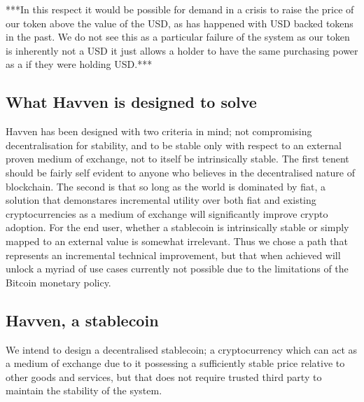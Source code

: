 ***In this respect it would be possible for demand in a crisis to raise the price of our token above the value of the USD, as has happened with USD backed tokens in the past. We do not see this as a particular failure of the system as our token is inherently not a USD it just allows a holder to have the same purchasing power as a if they were holding USD.***

\subsection{What Havven is designed to solve}

\noindent Havven has been designed with two criteria in mind; not compromising decentralisation for stability, and to be stable only with respect to an external proven medium of exchange, not to itself be intrinsically stable. The first tenent should be fairly self evident to anyone who believes in the decentralised nature of blockchain. The second is that so long as the world is dominated by fiat, a solution that demonstares incremental utility over both fiat and existing cryptocurrencies as a medium of exchange will significantly improve crypto adoption. For the end user, whether a stablecoin is intrinsically stable or simply mapped to an external value is somewhat irrelevant. Thus we chose a path that represents an incremental technical improvement, but that when achieved will unlock a myriad of use cases currently not possible due to the limitations of the Bitcoin monetary policy. \\

\subsection{Havven, a stablecoin}

\noindent We intend to design a decentralised stablecoin; a cryptocurrency which can act as a medium of exchange due to it possessing a sufficiently stable price relative to other goods and services, but that does not require trusted third party to maintain the stability of the system.\\

